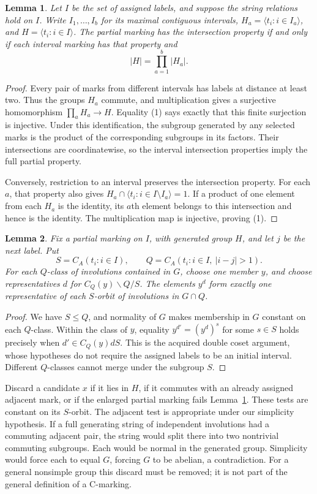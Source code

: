 \documentclass[11pt,a4paper]{article}
\newtheorem{lemma}{Lemma}
\newcommand{\gen}[1]{\langle#1\rangle}
\begin{document}
\begin{lemma}\label{partial}
Let $I$ be the set of assigned labels, and suppose the string relations
hold on $I$. Write $I_1,\ldots,I_b$ for its maximal contiguous intervals,
$H_a=\gen{t_i:i\in I_a}$, and $H=\gen{t_i:i\in I}$. The partial marking
has the intersection property if and only if each interval marking has
that property and
\[
                         |H|=\prod_{a=1}^b |H_a|.                 \tag{1}
\]
\end{lemma}
\begin{proof}
Every pair of marks from different intervals has labels at distance at
least two. Thus the groups $H_a$ commute, and multiplication gives a
surjective homomorphism $\prod_a H_a\to H$. Equality (1) says exactly
that this finite surjection is injective. Under this identification,
the subgroup generated by any selected marks is the product of the
corresponding subgroups in its factors. Their intersections are
coordinatewise, so the interval intersection properties imply the full
partial property.

Conversely, restriction to an interval preserves the intersection
property. For each $a$, that property also gives
$H_a\cap\gen{t_i:i\in I\setminus I_a}=1$. If a product of one element
from each $H_a$ is the identity, its $a$th element belongs to this
intersection and hence is the identity. The multiplication map is
injective, proving (1).
\end{proof}

\begin{lemma}\label{candidates}
Fix a partial marking on $I$, with generated group $H$, and let $j$ be
the next label. Put
\[
 S=C_A(t_i:i\in I),\qquad
 Q=C_A(t_i:i\in I,\ |i-j|>1).
\]
For each $Q$-class of involutions contained in $G$, choose one member
$y$, and choose representatives $d$ for $C_Q(y)\backslash Q/S$.
The elements $y^d$ form exactly one representative of each $S$-orbit of
involutions in $G\cap Q$.
\end{lemma}
\begin{proof}
We have $S\leq Q$, and normality of $G$ makes membership in $G$
constant on each $Q$-class. Within the class of $y$, equality
$y^{d'}=(y^d)^s$ for some $s\in S$ holds precisely when
$d'\in C_Q(y)dS$. This is the acquired double coset argument, whose
hypotheses do not require the assigned labels to be an initial interval.
Different $Q$-classes cannot merge under the subgroup $S$.
\end{proof}

Discard a candidate $x$ if it lies in $H$, if it commutes with an
already assigned adjacent mark, or if the enlarged partial marking
fails Lemma~\ref{partial}. These tests are constant on its $S$-orbit.
The adjacent test is appropriate under our simplicity hypothesis. If a
full generating string of independent involutions had a commuting
adjacent pair, the string would split there into two nontrivial
commuting subgroups. Each would be normal in the generated group.
Simplicity would force each to equal $G$, forcing $G$ to be abelian,
a contradiction. For a general nonsimple group this discard must be
removed; it is not part of the general definition of a C-marking.
\end{document}
